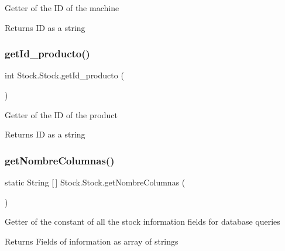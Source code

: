 Getter of the ID of the machine

\begin{DoxyReturn}{Returns}
ID as a string 
\end{DoxyReturn}
\mbox{\label{class_stock_1_1_stock_aa5fac816e624d7e89c4f9f9d081251dc}} 
\subsubsection{\texorpdfstring{get\+Id\+\_\+producto()}{getId\_producto()}}
{\footnotesize\ttfamily int Stock.\+Stock.\+get\+Id\+\_\+producto (\begin{DoxyParamCaption}{ }\end{DoxyParamCaption})}

Getter of the ID of the product

\begin{DoxyReturn}{Returns}
ID as a string 
\end{DoxyReturn}
\mbox{\label{class_stock_1_1_stock_a5007745c69c26fcf79c85b18497c7b43}} 
\subsubsection{\texorpdfstring{get\+Nombre\+Columnas()}{getNombreColumnas()}}
{\footnotesize\ttfamily static String \mbox{[}$\,$\mbox{]} Stock.\+Stock.\+get\+Nombre\+Columnas (\begin{DoxyParamCaption}{ }\end{DoxyParamCaption})\hspace{0.3cm}{\ttfamily [static]}}

Getter of the constant of all the stock information fields for database queries

\begin{DoxyReturn}{Returns}
Fields of information as array of strings 
\end{DoxyReturn}
\mbox{\label{class_stock_1_1_stock_a9418c579ab8866675c103afb3908133e}} 
